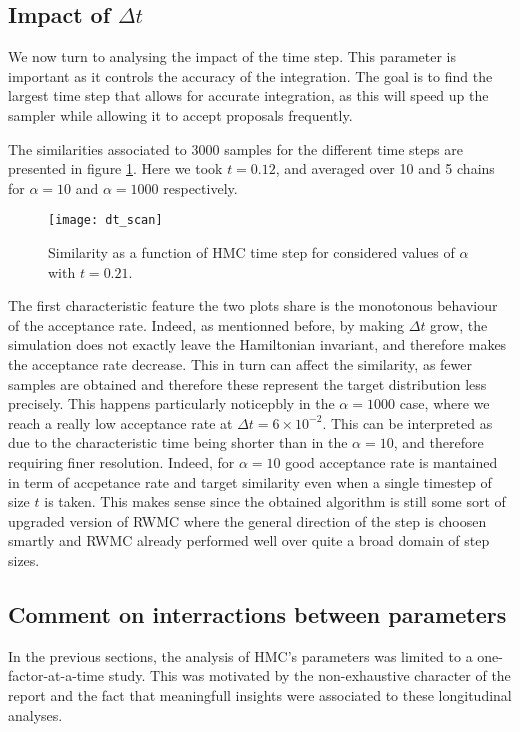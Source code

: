 \documentclass[a4paper, 12pt,oneside]{article}
\begin{document}
			\subsection{Impact of $\Delta t$}
			We now turn to analysing the impact of the time step. This parameter is important as it controls the accuracy of the integration. The goal is to find the largest time step that allows for accurate integration, as this will speed up the sampler while allowing it to accept proposals frequently.

			The similarities associated to 3000 samples for the different time steps are presented in figure \ref{fig:dt-scan}. Here we took $t=0.12$, and averaged over 10 and 5 chains for $\alpha=10$ and $\alpha=1000$ respectively. 
			\begin{figure}[htb]
				\centering
					\vspace{0em}
					\texttt{[image: dt\_scan]}
					\caption{Similarity as a function of HMC time step for considered values of $\alpha$ with $t=0.21$.}
					\label{fig:dt-scan}
			\end{figure}
			The first characteristic feature the two plots share is the monotonous behaviour of the acceptance rate. Indeed, as mentionned before, by making $\Delta t$ grow, the simulation does not exactly leave the Hamiltonian invariant, and therefore makes the acceptance rate decrease. This in turn can affect the similarity, as fewer samples are obtained and therefore these represent the target distribution less precisely. This happens particularly noticepbly in the $\alpha=1000$ case, where we reach a really low acceptance rate at $\Delta t=6\times 10^{-2}$. This can be interpreted as due to the characteristic time being shorter than in the $\alpha=10$, and therefore requiring finer resolution. Indeed, for $\alpha=10$ good acceptance rate is mantained in term of accpetance rate and target similarity even when a single timestep of size $t$ is taken. This makes sense since the obtained algorithm is still some sort of upgraded version of RWMC where the general direction of the step is choosen smartly and RWMC already performed well over quite a broad domain of step sizes.   
			\subsection{Comment on interractions between parameters}
			In the previous sections, the analysis of HMC's parameters was limited to a one-factor-at-a-time study. This was motivated by the non-exhaustive character of the report and the fact that meaningfull insights were associated to these longitudinal analyses. 
			
\end{document}

